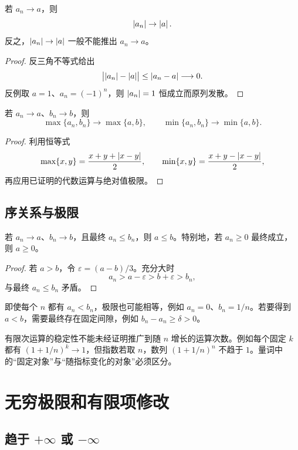 \begin{theorem}
若 \(a_n\to a\)，则
\[
 \left|a_n\right|\to\left|a\right|.
\]
反之，\(\left|a_n\right|\to\left|a\right|\) 一般不能推出 \(a_n\to a\)。
\end{theorem}

\begin{proof}
反三角不等式给出
\[
 \bigl|\left|a_n\right|-\left|a\right|\bigr|\le\left|a_n-a\right|\longrightarrow0.
\]
反例取 \(a=1\)、\(a_n=(-1)^n\)，则 \(\left|a_n\right|=1\) 恒成立而原列发散。
\end{proof}

\begin{proposition}
若 \(a_n\to a\)、\(b_n\to b\)，则
\[
 \max\{a_n,b_n\}\to\max\{a,b\},\qquad
 \min\{a_n,b_n\}\to\min\{a,b\}.
\]
\end{proposition}

\begin{proof}
利用恒等式
\[
 \max\{x,y\}=\frac{x+y+\left|x-y\right|}2,\qquad
 \min\{x,y\}=\frac{x+y-\left|x-y\right|}2,
\]
再应用已证明的代数运算与绝对值极限。
\end{proof}

\subsection{序关系与极限}

\begin{theorem}[序关系的闭性]
若 \(a_n\to a\)、\(b_n\to b\)，且最终 \(a_n\le b_n\)，则 \(a\le b\)。特别地，若 \(a_n\ge0\) 最终成立，则 \(a\ge0\)。
\end{theorem}

\begin{proof}
若 \(a>b\)，令 \(\varepsilon=(a-b)/3\)。充分大时
\[
 a_n>a-\varepsilon>b+\varepsilon>b_n,
\]
与最终 \(a_n\le b_n\) 矛盾。
\end{proof}

即使每个 \(n\) 都有 \(a_n<b_n\)，极限也可能相等，例如 \(a_n=0\)、\(b_n=1/n\)。若要得到 \(a<b\)，需要最终存在固定间隙，例如 \(b_n-a_n\ge\delta>0\)。

有限次运算的稳定性不能未经证明推广到随 \(n\) 增长的运算次数。例如每个固定 \(k\) 都有 \((1+1/n)^k\to1\)，但指数若取 \(n\)，数列 \((1+1/n)^n\) 不趋于 \(1\)。量词中的“固定对象”与“随指标变化的对象”必须区分。

\section{无穷极限和有限项修改}

\subsection{趋于 \texorpdfstring{\(+\infty\)}{+infinity} 或 \texorpdfstring{\(-\infty\)}{-infinity}}

